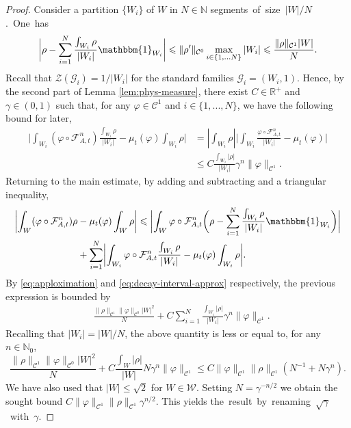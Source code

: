 \documentclass{amsart}
\numberwithin{equation}{section}
\newcommand\vf{\varphi}
\renewcommand{\le}{\leqslant}
\newcommand\cC{{\mathcal C}}
\newcommand\cF{{\mathcal F}}
\newcommand\cG{{\mathcal G}}
\newcommand\cW{{\mathcal W}}
\newcommand\cZ{{\mathcal Z}}
\newcommand\bN{{\mathbb N}}
\newcommand\bR{{\mathbb R}}
\newcommand{\catt}{\cF_{A,t}}
\begin{document}
\begin{proof}
Consider a partition \(\{W_i\}\) of \(W\) in \(N \!\in \!\bN\) \mbox{segments of size \(|W|/N\). One has}
\begin{equation}\label{eq:apploximation}
\biggl|\rho - \sum_{i=1}^N \frac{\int_{W_i}\rho}{|W_i|} \mathbbm{1}_{W_i} \biggr| \le \|\rho'\|_{\cC^0}\max_{i \in\{1,...N\}}|W_i| \le \frac{\|\rho\|_{\cC^1}|W|}{N}.
\end{equation}
Recall that \(\cZ(\cG_i) = 1/|W_i|\) for the standard families \(\cG_i = (W_i, 1)\). Hence, by the second part of Lemma \ref{lem:phys-measure}, there exist \(C \in \bR^+\) and \(\gamma \in (0,1)\) such that, for any \(\vf \in \cC^1\) and \(i \in \{1,...,N\}\), we have the following bound for later,
\begin{equation}\label{eq:decay-interval-approx}
\begin{split}
\biggl|\int_{W_i} \!\!(\vf \circ \catt^n) \frac{\int_{W_i}\rho}{|W_i|} - \mu_t(\vf)\int_{W_i}\!\!\rho \biggr| & = \left|\int_{W_i}\rho\right| \biggl|\int_{W_i} \frac{\vf \circ \catt^n}{|W_i|}  - \mu_t(\vf)\biggr| \\
&\le  C\frac{\int_{W_i}|\rho|}{|W_i|}  \gamma^n \|\vf\|_{\cC^1}.
\end{split}
\end{equation}
Returning to the main estimate, by adding and subtracting and a triangular inequality,
\[
\begin{split}
\biggl|\int_{W} (\vf \circ \catt^n)\rho &- \mu_t(\vf)\int_{W} \rho \biggr| \le \biggl|\int_{W} \vf \circ \catt^n \biggl(\rho - \sum_{i=1}^N \frac{\int_{W_i}\rho}{|W_i|} \mathbbm{1}_{W_i}\biggr)\biggr|\\
&  +\sum_{i=1}^N \biggl| \int_{W_i} \vf \circ \catt^n \frac{\int_{W_i}\rho}{|W_i|}  -  \mu_t(\vf)\int_{W_i}\rho\biggr|.
\end{split}
\]
By \eqref{eq:apploximation} and \eqref{eq:decay-interval-approx} respectively, the previous expression is bounded by
\[
\begin{split}
&\frac{\|\rho\|_{\cC^1}\|\vf\|_{\cC^0}|W|^2}{N}+C \sum_{i=1}^N \frac{\int_{W_i}|\rho|}{|W_i|} \gamma^n \|\vf\|_{\cC^1}. 
\end{split}
\]
Recalling that \(|W_i| = |W|/N\), the above quantity is less or equal to, for any \(n \in \bN_0\),
\[
  \frac{\|\rho\|_{\cC^1}\|\vf\|_{\cC^0}|W|^2}{N} + C \frac{\int_{W}|\rho|}{|W|} N \gamma^n\|\vf\|_{\cC^1} \le C \|\vf\|_{\cC^1}\|\rho\|_{\cC^1} \left(  N^{-1}+ N \gamma^n \right).
\]
We have also used that \(|W| \!\le \!\sqrt{2}\) for \(W \!\in \!\cW\). Setting \(N \! =\! \gamma^{-n/2}\) we obtain the sought bound \(C \|\vf\|_{\cC^1}\|\rho\|_{\cC^1} \gamma^{n/2}\). \!\!This yields \mbox{the result by renaming \(\sqrt \gamma\) with \(\gamma\).} 
\end{proof}
\end{document}
